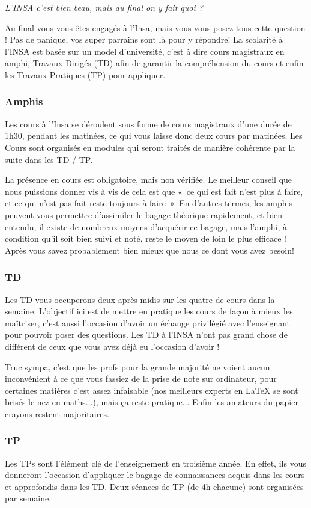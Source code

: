 \begin{citationii}
\emph{L'INSA c'est bien beau, mais au final on y fait quoi ?}
\end{citationii}
Au final vous vous êtes engagés à l'Insa, mais vous vous posez tous cette
question !
Pas de panique, vos super parrains sont là pour y répondre!
La scolarité à l'INSA est basée sur un model d'université, c'est à dire cours
magistraux en amphi, Travaux Dirigés (TD) afin de garantir la compréhension du
cours et enfin les Travaux Pratiques (TP) pour appliquer.

\subsubsection{Amphis}
Les cours à l'Insa se déroulent sous forme de cours magistraux d'une durée de
1h30, pendant les matinées, ce qui vous
laisse donc deux cours par matinées. Les Cours sont organisés en modules qui
seront traités de manière cohérente par la suite dans les TD / TP.

La présence en cours est obligatoire, mais non vérifiée. Le meilleur conseil que
nous puissions donner vis à vis de cela est que «~ce qui est fait n'est plus à
faire, et ce qui n'est pas fait reste toujours à faire~». En d'autres termes, les
amphis peuvent vous permettre d'assimiler le bagage théorique rapidement, et bien
entendu, il existe de nombreux moyens d'acquérir ce bagage, mais l'amphi, à
condition qu'il soit bien suivi et noté, reste le moyen de loin le plus efficace
! Après vous savez probablement bien mieux que nous ce dont vous avez besoin!
\subsubsection{TD}
Les TD vous occuperons deux après-midis sur les quatre de cours dans la semaine.
L'objectif ici est de mettre en pratique les cours de façon à mieux les
maîtriser, c'est aussi l'occasion d'avoir un échange privilégié avec
l'enseignant pour pouvoir poser des questions. Les TD à l'INSA n'ont pas grand
chose de différent de ceux que vous avez déjà eu l'occasion d'avoir ! 

Truc sympa, c'est que les profs pour la grande majorité ne voient aucun
inconvénient à ce que vous fassiez de la prise de note sur ordinateur, pour
certaines matières c'est assez infaisable (nos meilleurs experts en \LaTeX{} se
sont brisés le nez en maths...), mais ça reste pratique... Enfin les
amateurs du papier-crayons restent majoritaires.
\subsubsection{TP}
Les TPs sont l'élément clé de l'enseignement en troisième année. En effet, ils
vous donneront l'occasion d'appliquer le bagage de connaissances acquis dans
les cours et approfondis dans les TD. Deux séances de TP (de 4h chacune) sont
organisées par semaine.

